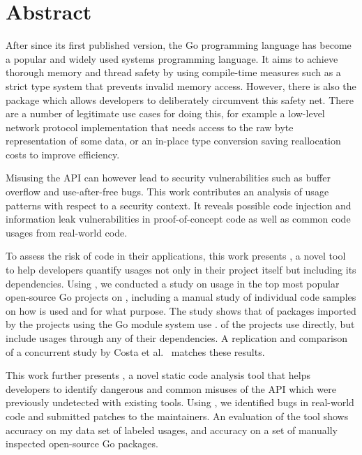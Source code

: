 \chapter*{Abstract}

After  since its first published version, the Go programming language has become a popular and
widely used systems programming language.
It aims to achieve thorough memory and thread safety by using compile-time measures such as a strict type system that
prevents invalid memory access.
However, there is also the \unsafe{} package which allows developers to deliberately circumvent this safety net.
There are a number of legitimate use cases for doing this, for example a low-level network protocol implementation that
needs access to the raw byte representation of some data, or an in-place type conversion saving reallocation costs to
improve efficiency.

Misusing the \unsafe{} API can however lead to security vulnerabilities such as buffer overflow and use-after-free bugs.
This work contributes an analysis of \unsafe{} usage patterns with respect to a security context.
It reveals possible code injection and information leak vulnerabilities in proof-of-concept code as well as common code
usages from real-world code.

To assess the risk of \unsafe{} code in their applications, this work presents \toolGeiger{}, a novel tool to help
developers quantify \unsafe{} usages not only in their project itself but including its dependencies.
Using \toolGeiger{}, we conducted a study on \unsafe{} usage in the top \projsTotal{} most popular open-source Go
projects on \github{}, including a manual study of \numberLabeledCodeSnippets{} individual code samples on how \unsafe{}
is used and for what purpose.
The study shows that \percentageUnsafePackages{} of packages imported by the projects using the Go module system use
\unsafe{}.
\percentageUnsafeProjects{} of the projects use \unsafe{} directly, but \percentageUnsafeTransitiveWithDependencies{}
include \unsafe{} usages through any of their dependencies.
A replication and comparison of a concurrent study by Costa et al.~\cite{costa2020} matches these results.

This work further presents \toolSafer{}, a novel static code analysis tool that helps developers to identify
 dangerous and common misuses of the \unsafe{} API which were previously undetected with existing tools.
Using \toolSafer{}, we identified \numberBugsFixed{} bugs in real-world code and submitted patches to the maintainers.
An evaluation of the tool shows \goSaferEvaluationDatasetGosaferAccuracy{} accuracy on my data set of labeled \unsafe{}
usages, and \goSaferEvaluationPackagesGosaferAccuracy{} accuracy on a set of manually inspected open-source Go packages.


